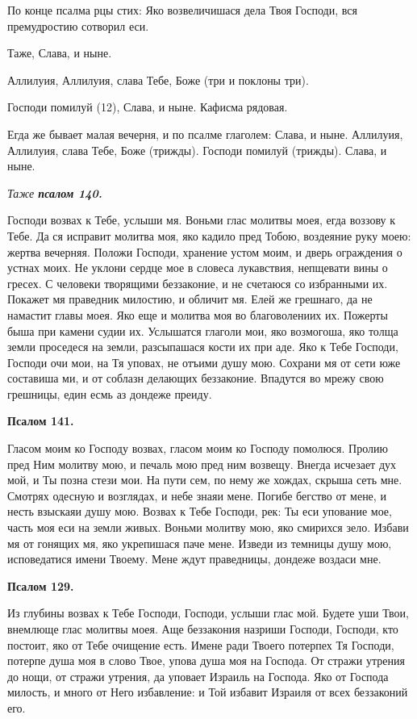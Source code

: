 По конце псалма рцы стих: Яко возвеличишася дела Твоя Господи, вся премудростию сотворил еси. 

Таже, Слава, и ныне.

Аллилуия, Аллилуия, слава Тебе, Боже (три и поклоны три).

Господи помилуй (12), Слава, и ныне. Кафисма рядовая.

Егда же бывает малая вечерня, и по псалме глаголем: Слава, и ныне. Аллилуия, Аллилуия, слава Тебе, Боже (трижды). Господи помилуй (трижды). Слава, и ныне.


\medskip


\itshape Таже \normalfont{}\bfseries псалом 140.\normalfont{}


Господи возвах к Тебе, услыши мя. Воньми глас молитвы моея, егда воззову к Тебе. Да ся исправит молитва моя, яко кадило пред Тобою, воздеяние руку моею: жертва вечерняя. Положи Господи, хранение устом моим, и дверь ограждения о устнах моих. Не уклони сердце мое в словеса лукавствия, непщевати вины о гресех. С человеки творящими беззаконие, и не счетаюся со избранными их. Покажет мя праведник милостию, и обличит мя. Елей же грешнаго, да не намастит главы моея. Яко еще и молитва моя во благоволениих их. Пожерты быша при камени судии их. Услышатся глаголи мои, яко возмогоша, яко толща земли проседеся на земли, разсыпашася кости их при аде. Яко к Тебе Господи, Господи очи мои, на Тя уповах, не отъими душу мою. Сохрани мя от сети юже составиша ми, и от соблазн делающих беззаконие. Впадутся во мрежу свою грешницы, един есмь аз дондеже преиду.


\medskip


\bfseries Псалом 141.\normalfont{}


Гласом моим ко Господу возвах, гласом моим ко Господу помолюся. Пролию пред Ним молитву мою, и печаль мою пред ним возвещу. Внегда исчезает дух мой, и Ты позна стези мои. На пути сем, по нему же хождах, скрыша сеть мне. Смотрях одесную и возглядах, и небе знаяи мене. Погибе бегство от мене, и несть взыскаяи душу мою. Возвах к Тебе Господи, рек: Ты еси упование мое, часть моя еси на земли живых. Воньми молитву мою, яко смирихся зело. Избави мя от гонящих мя, яко укрепишася паче мене. Изведи из темницы душу мою, исповедатися имени Твоему. Мене ждут праведницы, дондеже воздаси мне.


\medskip


\bfseries Псалом 129.\normalfont{}


Из глубины возвах к Тебе Господи, Господи, услыши глас мой. Будете уши Твои, внемлюще глас молитвы моея. Аще беззакония назриши Господи, Господи, кто постоит, яко от Тебе очищение есть. Имене ради Твоего потерпех Тя Господи, потерпе душа моя в слово Твое, упова душа моя на Господа. От стражи утрения до нощи, от стражи утрения, да уповает Израиль на Господа. Яко от Господа милость, и много от Него избавление: и Той избавит Израиля от всех беззаконий его.


